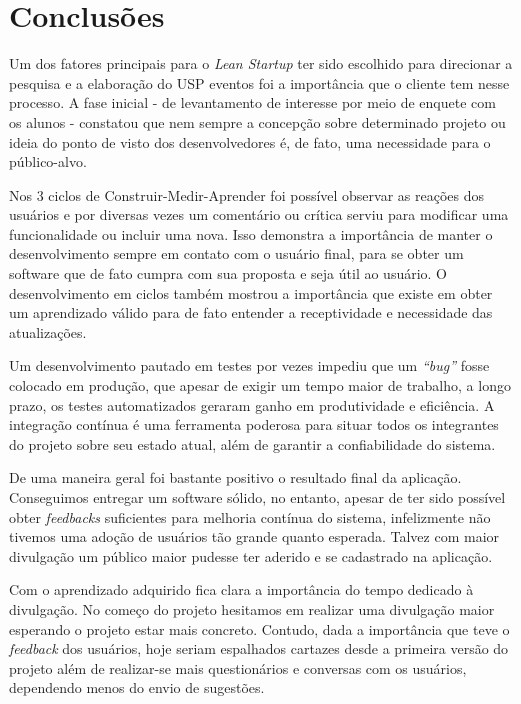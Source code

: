 \chapter{Conclusões}
\label{cap:conclusoes}

\par Um dos fatores principais para o \emph{Lean Startup} ter sido escolhido para direcionar a pesquisa e a elaboração do USP eventos foi a importância que o cliente tem nesse processo. A fase inicial - de levantamento de interesse por meio de enquete com os alunos - constatou que nem sempre a concepção sobre determinado projeto ou ideia do ponto de visto dos desenvolvedores é, de fato, uma necessidade para o público-alvo.

\par Nos 3 ciclos de Construir-Medir-Aprender foi possível observar as reações dos usuários e por diversas vezes um comentário ou crítica serviu para modificar uma funcionalidade ou incluir uma nova. Isso demonstra a importância de manter o desenvolvimento sempre em contato com o usuário final, para se obter um software que de fato cumpra com sua proposta e seja útil ao usuário. O desenvolvimento em ciclos também mostrou a importância que existe em obter um aprendizado válido para de fato entender a receptividade e necessidade das atualizações.

\par Um desenvolvimento pautado em testes por vezes impediu que um \emph{``bug''} fosse colocado em produção, que apesar de exigir um tempo maior de trabalho, a longo prazo, os testes automatizados geraram ganho em produtividade e eficiência. A integração contínua é uma ferramenta poderosa para situar todos os integrantes do projeto sobre seu estado atual, além de garantir a confiabilidade do sistema.

\par De uma maneira geral foi bastante positivo o resultado final da aplicação. Conseguimos entregar um software sólido, no entanto, apesar de ter sido possível obter \emph{feedbacks} suficientes para melhoria contínua do sistema, infelizmente não tivemos uma adoção de usuários tão grande quanto esperada. Talvez com maior divulgação um público maior pudesse ter aderido e se cadastrado na aplicação.

\par Com o aprendizado adquirido fica clara a importância do tempo dedicado à divulgação. No começo do projeto hesitamos em realizar uma divulgação maior esperando o projeto estar mais concreto. Contudo, dada a importância que teve o \emph{feedback} dos usuários, hoje seriam espalhados cartazes desde a primeira versão do projeto além de realizar-se mais questionários e conversas com os usuários, dependendo menos do envio de sugestões.

